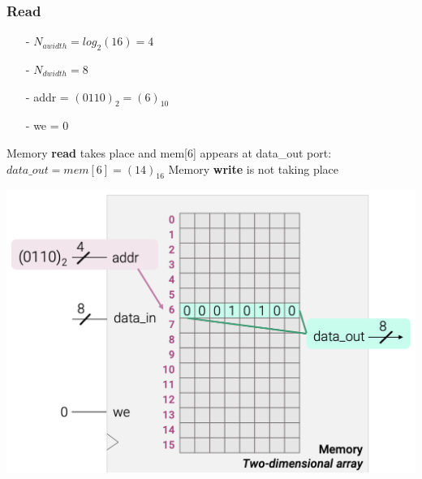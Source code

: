 \documentclass[12pt,openany]{book}
\begin{document}
\subsubsection{Read}
\begin{minipage}[htp]{0.4\textwidth}

\begin{justify}
		\begin{itemize}
    		\item[-] $N_{awidth} = log_2(16) = 4$
			\item[-] $N_{dwidth} = 8$
			\item[-] addr = $(0110)_2 = (6)_{10}$
			\item[-] we = 0
		\end{itemize}
		Memory \textbf{read} takes place and mem[6] appears at data\_out port: $data\_out = mem[6] = (14)_{16}$
	\newline 
	\vspace*{5px}
		Memory \textbf{write} is not taking place
\end{justify}
	\end{minipage}
	\hfill
	\vline
	\hfill
	\begin{minipage}[htp]{0.5\textwidth}
	\centering
	\includegraphics[width=1.3\textwidth]{circuits/16.2.5_2.png}
\end{minipage}
\end{document}
